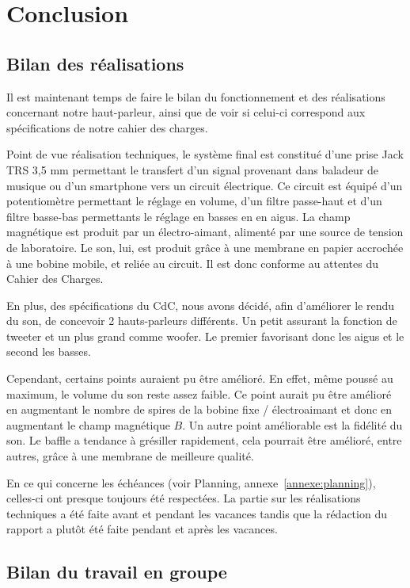 \chapter{Conclusion}

\section{Bilan des réalisations}

Il est maintenant temps de faire le bilan du fonctionnement et des réalisations concernant notre haut-parleur, ainsi que de voir si celui-ci correspond aux spécifications de notre cahier des charges.

Point de vue réalisation techniques, le système final est constitué d'une prise Jack TRS 3,5 mm permettant le transfert d'un signal provenant dans baladeur de musique ou d'un smartphone vers un circuit électrique. Ce circuit est équipé d'un potentiomètre permettant le réglage en volume, d'un filtre passe-haut et d'un filtre basse-bas permettants le réglage en basses en en aigus. La champ magnétique est produit par un électro-aimant, alimenté par une source de tension de laboratoire. Le son, lui, est produit grâce à une membrane en papier accrochée à une bobine mobile, et reliée au circuit. Il est donc conforme au attentes du Cahier des Charges.

En plus, des spécifications du CdC, nous avons décidé, afin d'améliorer le rendu du son, de concevoir 2 hauts-parleurs différents. Un petit assurant la fonction de tweeter et un plus grand comme woofer. Le premier favorisant donc les aigus et le second les basses.

Cependant, certains points auraient pu être amélioré. En effet, même poussé au maximum, le volume du son reste assez faible.  Ce point aurait pu être amélioré en augmentant le nombre de spires de la bobine fixe / électroaimant et donc en augmentant le champ magnétique $B$.
Un autre point améliorable est la fidélité du son. Le baffle a tendance à grésiller rapidement, cela pourrait être amélioré, entre autres, grâce à une membrane de meilleure qualité.

En ce qui concerne les échéances (voir Planning, annexe~\ref{annexe:planning}), celles-ci ont presque toujours été respectées. La partie sur les réalisations techniques a été faite avant et pendant les vacances tandis que la rédaction du rapport a plutôt été faite pendant et après les vacances.

\section{Bilan du travail en groupe}

